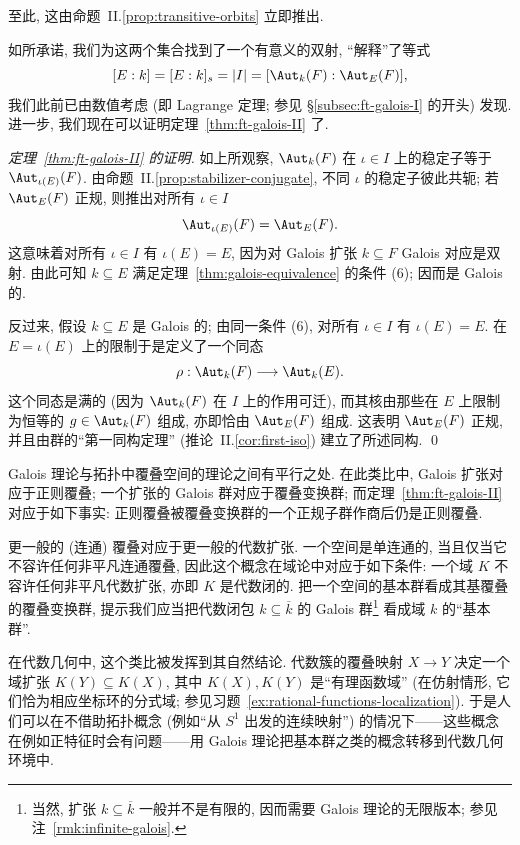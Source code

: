 至此, 这由命题~II.\ref{prop:transitive-orbits} 立即推出.

如所承诺, 我们为这两个集合找到了一个有意义的双射, ``解释''了等式
\[
[E:k]=[E:k]_s=|I|=[\Aut_k(F):\Aut_E(F)],
\]
我们此前已由数值考虑 (即 Lagrange 定理; 参见 §\ref{subsec:ft-galois-I} 的开头) 发现. 进一步, 我们现在可以证明定理~\ref{thm:ft-galois-II} 了.

\begin{proof}[定理~\ref{thm:ft-galois-II} 的证明]
如上所观察, $\Aut_k(F)$ 在 $\iota\in I$ 上的稳定子等于 $\Aut_{\iota(E)}(F)$. 由命题~II.\ref{prop:stabilizer-conjugate}, 不同 $\iota$ 的稳定子彼此共轭; 若 $\Aut_E(F)$ 正规, 则推出对所有 $\iota\in I$
\[
\Aut_{\iota(E)}(F)=\Aut_E(F).
\]
这意味着对所有 $\iota\in I$ 有 $\iota(E)=E$, 因为对 Galois 扩张 $k\subseteq F$ Galois 对应是双射. 由此可知 $k\subseteq E$ 满足定理~\ref{thm:galois-equivalence} 的条件 (6); 因而是 Galois 的.

反过来, 假设 $k\subseteq E$ 是 Galois 的; 由同一条件 (6), 对所有 $\iota\in I$ 有 $\iota(E)=E$. 在 $E=\iota(E)$ 上的限制于是定义了一个同态
\[
\rho:\Aut_k(F)\longrightarrow\Aut_k(E).
\]
这个同态是满的 (因为 $\Aut_k(F)$ 在 $I$ 上的作用可迁), 而其核由那些在 $E$ 上限制为恒等的 $g\in\Aut_k(F)$ 组成, 亦即恰由 $\Aut_E(F)$ 组成. 这表明 $\Aut_E(F)$ 正规, 并且由群的``第一同构定理'' (推论~II.\ref{cor:first-iso}) 建立了所述同构. \qed
\end{proof}

\begin{remark}\label{rmk:galois-cover}
Galois 理论与拓扑中覆叠空间的理论之间有平行之处. 在此类比中, Galois 扩张对应于正则覆叠; 一个扩张的 Galois 群对应于覆叠变换群; 而定理~\ref{thm:ft-galois-II} 对应于如下事实: 正则覆叠被覆叠变换群的一个正规子群作商后仍是正则覆叠.

更一般的 (连通) 覆叠对应于更一般的代数扩张. 一个空间是单连通的, 当且仅当它不容许任何非平凡连通覆叠, 因此这个概念在域论中对应于如下条件: 一个域 $K$ 不容许任何非平凡代数扩张, 亦即 $K$ 是代数闭的. 把一个空间的基本群看成其基覆叠的覆叠变换群, 提示我们应当把代数闭包 $k\subseteq\overline{k}$ 的 Galois 群\footnote{当然, 扩张 $k\subseteq\overline k$ 一般并不是有限的, 因而需要 Galois 理论的无限版本; 参见注~\ref{rmk:infinite-galois}.} 看成域 $k$ 的``基本群''.

在代数几何中, 这个类比被发挥到其自然结论. 代数簇的覆叠映射 $X\to Y$ 决定一个域扩张 $K(Y)\subseteq K(X)$, 其中 $K(X),K(Y)$ 是``有理函数域'' (在仿射情形, 它们恰为相应坐标环的分式域; 参见习题~\ref{ex:rational-functions-localization}). 于是人们可以在不借助拓扑概念 (例如``从 $S^1$ 出发的连续映射'') 的情况下——这些概念在例如正特征时会有问题——用 Galois 理论把基本群之类的概念转移到代数几何环境中.
\end{remark}

